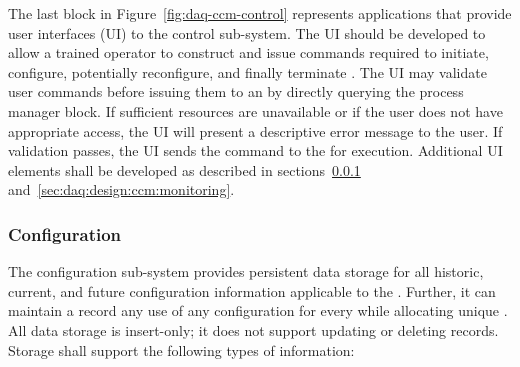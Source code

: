 The last block in Figure~\ref{fig:daq-ccm-control} represents applications that provide user interfaces (UI) to the control sub-system. The UI should be developed to allow a trained operator to construct and issue commands required to initiate, configure, potentially reconfigure, and finally terminate . 
The UI may validate user commands before issuing them to an  by directly querying the process manager block. 
If sufficient resources are unavailable or if the user does not have appropriate access,  the UI will present a descriptive error message to the user.
If validation passes,  the UI sends the command to the  for execution. 
Additional UI elements shall be developed as described in sections~\ref{sec:daq:design:ccm:configuration} and~\ref{sec:daq:design:ccm:monitoring}.


\subsubsection{Configuration}
\label{sec:daq:design:ccm:configuration}

The  configuration sub-system provides persistent data storage for all historic, current, and future configuration information applicable to the .
Further, it can maintain a record any use of any configuration for every  while allocating unique . 
All data storage is insert-only; it does not support updating or deleting records.
Storage shall support the following types of information:


